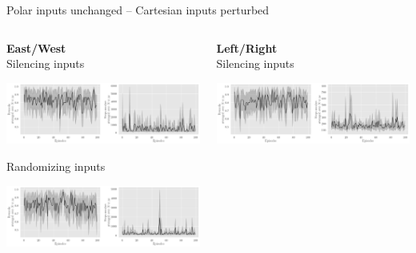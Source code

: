 \documentclass[bigger]{beamer}
\begin{document}
\begin{frame}[label={sec:org29a5971}]{Polar inputs unchanged -- Cartesian inputs perturbed}
\begin{columns}
\begin{column}[c]{0.5\columnwidth}
\begin{center}
\small
\textbf{East/West}\\
\footnotesize
Silencing inputs
\end{center}
\begin{center}
\includegraphics[width=\textwidth]{medias/EastWest/exp_keep-polar_silence-True.png}
\end{center}
\begin{center}
\footnotesize
Randomizing inputs
\end{center}
\begin{center}
\includegraphics[width=\textwidth]{medias/EastWest/exp_keep-polar_silence-False.png}
\end{center}
\end{column}
\begin{column}[c]{0.5\columnwidth}
\begin{center}
\small
\textbf{Left/Right}\\
\footnotesize
Silencing inputs
\end{center}
\begin{center}
\includegraphics[width=\textwidth]{medias/LeftRight/exp_keep-polar_silence-True.png}

\end{center}
\end{column}
\end{columns}
\end{frame}
\end{document}
